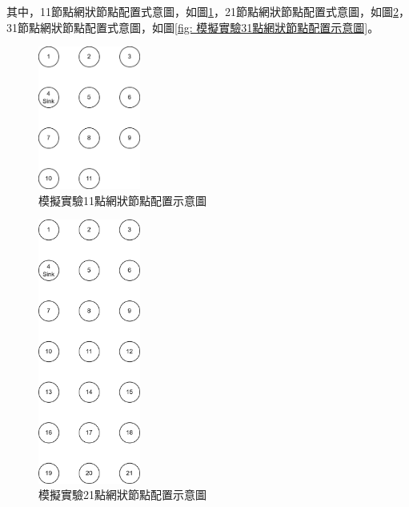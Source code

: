 \begin{ZhChapter}
其中，11節點網狀節點配置式意圖，如圖\ref{fig: 模擬實驗11點網狀節點配置示意圖}，21節點網狀節點配置式意圖，如圖\ref{fig: 模擬實驗21點網狀節點配置示意圖}，31節點網狀節點配置式意圖，如圖\ref{fig: 模擬實驗31點網狀節點配置示意圖}。

\begin{figure}[H]
    \centering
    \includegraphics[width = 0.3\textwidth]{image/模擬實驗11點網狀節點配置示意圖.png}
    \caption{模擬實驗11點網狀節點配置示意圖}
    \label{fig: 模擬實驗11點網狀節點配置示意圖}
\end{figure}

\begin{figure}[H]
    \centering
    \includegraphics[width = 0.3\textwidth]{image/模擬實驗21點網狀節點配置示意圖.png}
    \caption{模擬實驗21點網狀節點配置示意圖}
    \label{fig: 模擬實驗21點網狀節點配置示意圖}
\end{figure}


\end{ZhChapter}
